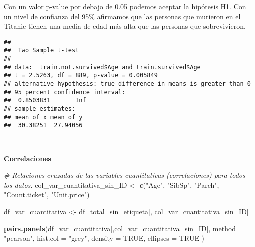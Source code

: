 \documentclass[
]{article}
\newenvironment{Shaded}{\begin{snugshade}}{\end{snugshade}}
\newcommand{\CommentTok}[1]{\textcolor[rgb]{0.56,0.35,0.01}{\textit{#1}}}
\newcommand{\DataTypeTok}[1]{\textcolor[rgb]{0.13,0.29,0.53}{#1}}
\newcommand{\KeywordTok}[1]{\textcolor[rgb]{0.13,0.29,0.53}{\textbf{#1}}}
\newcommand{\NormalTok}[1]{#1}
\newcommand{\OperatorTok}[1]{\textcolor[rgb]{0.81,0.36,0.00}{\textbf{#1}}}
\newcommand{\OtherTok}[1]{\textcolor[rgb]{0.56,0.35,0.01}{#1}}
\newcommand{\StringTok}[1]{\textcolor[rgb]{0.31,0.60,0.02}{#1}}
\begin{document}
Con un valor p-value por debajo de 0.05 podemos aceptar la hipótesis H1.
Con un nivel de confianza del 95\% afirmamos que las personas que
murieron en el Titanic tienen una media de edad más alta que las
personas que sobrevivieron.

\texttt{}

\begin{Shaded}
\end{Shaded}

\begin{verbatim}
## 
##  Two Sample t-test
## 
## data:  train.not.survived$Age and train.survived$Age
## t = 2.5263, df = 889, p-value = 0.005849
## alternative hypothesis: true difference in means is greater than 0
## 95 percent confidence interval:
##  0.8503831       Inf
## sample estimates:
## mean of x mean of y 
##  30.38251  27.94056
\end{verbatim}

\texttt{}\\
\texttt{}

\textbf{Correlaciones}

\texttt{}

\begin{Shaded}
\begin{Highlighting}[]
\CommentTok{# Relaciones cruzadas de las variables cuantitativas (correlaciones) para todos los datos.}
\NormalTok{col_var_cuantitativa_sin_ID <-}\StringTok{ }\KeywordTok{c}\NormalTok{(}\StringTok{"Age"}\NormalTok{, }\StringTok{"SibSp"}\NormalTok{, }\StringTok{"Parch"}\NormalTok{, }\StringTok{"Count.ticket"}\NormalTok{, }\StringTok{"Unit.price"}\NormalTok{)}

\NormalTok{df_var_cuantitativa <-}\StringTok{ }\NormalTok{df_total_sin_etiqueta[, col_var_cuantitativa_sin_ID]}

\KeywordTok{pairs.panels}\NormalTok{(df_var_cuantitativa[,col_var_cuantitativa_sin_ID], }
             \DataTypeTok{method =} \StringTok{"pearson"}\NormalTok{, }
             \DataTypeTok{hist.col =} \StringTok{"grey"}\NormalTok{,}
             \DataTypeTok{density =} \OtherTok{TRUE}\NormalTok{,  }
             \DataTypeTok{ellipses =} \OtherTok{TRUE} 
\NormalTok{             )}
\end{Highlighting}
\end{Shaded}
\end{document}
